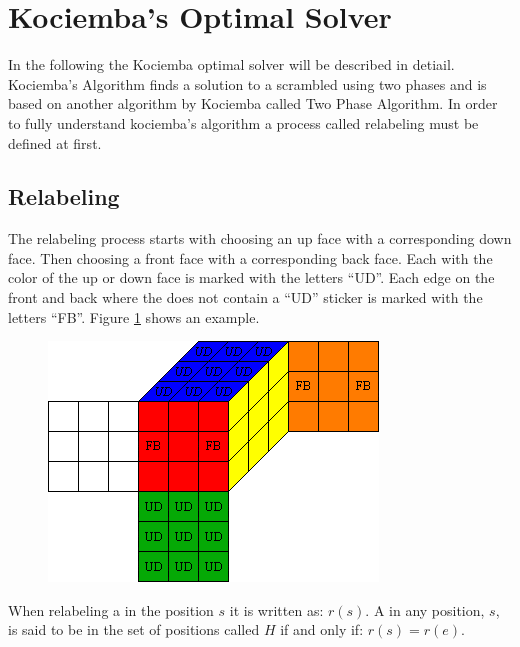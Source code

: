 \section{Kociemba's Optimal Solver}
In the following the Kociemba optimal solver\cite{kociemba09} will be described in detiail. Kociemba's Algorithm finds a solution to a scrambled \rubik{} using two phases and is based on another algorithm by Kociemba called Two Phase Algorithm. In order to fully understand kociemba's algorithm a process called relabeling must be defined at first. 

\subsection{Relabeling}
The relabeling process  starts with choosing an up face with a corresponding down face. Then choosing a front face with a corresponding back face. Each \facelet{} with the color of the up or down face is marked with the letters ``UD''.  Each edge \cpiece{} on the front and back where the \cpiece{} does not contain a ``UD'' sticker is marked with the letters ``FB''. Figure \ref{fig:relabelClean} shows an example.
\begin{figure}[hb]
	\centering
		\includegraphics[scale = 0.8]{input/pics/relabelClean}
	\caption{}
	\label{fig:relabelClean}
\end{figure}
When relabeling a \rubik{} in the position $s$ it is written as: $r(s)$. A \rubik{} in any position, $s$, is said to be in the set of positions called $H$ if and only if: $r(s)=r(e)$.

